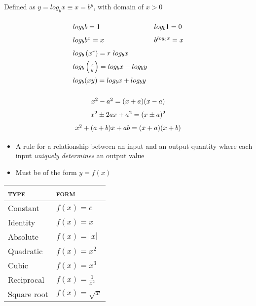 \hformbar




Defined as $y = log_b x \equiv x = b^y$, with domain of $x > 0$

\begin{center}
\vspace{-2em}
\[
\def\arraystretch{1.6}
 \begin{array}{ll}
   log_b b = 1 & log_b 1 = 0 \\
   log_b b^x = x & b^{log_b x} = x \\
   log_b \left( x^r \right) = r ~ log_b x &  \\
   log_b \left( \frac{x}{y} \right) = log_b x - log_b y & \\
   log_b (xy) = log_b x + log_b y & 
 \end{array}
\]
\end{center}

\hformbar




\begin{center}
\vspace{-2em}
\[
\def\arraystretch{1.6}
 \begin{array}{c}
   x^2 - a^2 = (x + a)(x -a ) \\
   x^2 \pm 2ax + a^2 = (x \pm a)^2 \\
   x^2 + (a + b)x + ab = (x + a)(x + b)
 \end{array}
\]
\end{center}

\hformbar






\begin{itemize}
	\item A rule for a relationship between an input and an output quantity where each input \textit{uniquely determines} an output value 
	\item Must be of the form $y = f(x)$
\end{itemize}

\begin{footnotesize}
  \begin{tabular}{ll}
    \textsc{type} & \textsc{form} \\
    \midrule
    Constant & $f(x) = c$ \\
    Identity & $f(x) = x$ \\
    Absolute & $f(x) = |x|$\\
    Quadratic & $f(x) = x^2$  \\
    Cubic     & $f(x) = x^3$  \\
    Reciprocal & $f(x) = \frac{1}{x^2}$  \\
    Square root & $f(x) = \sqrt{x}$  \\
  \end{tabular}
\end{footnotesize}
\hformbar



